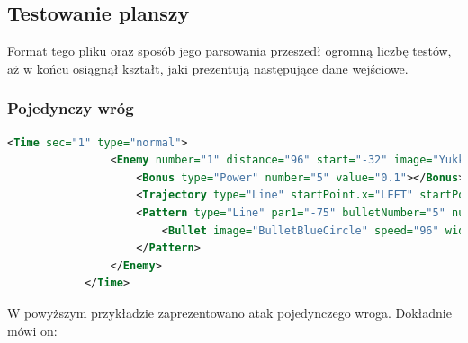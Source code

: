 		\subsection{Testowanie planszy}
		Format tego pliku oraz sposób jego parsowania przeszedł ogromną liczbę testów, aż w końcu osiągnął kształt, jaki prezentują następujące dane wejściowe.
		\subsubsection{Pojedynczy wróg}
		\begin{lstlisting}[language=xml]
			<Time sec="1" type="normal">
				<Enemy number="1" distance="96" start="-32" image="YukkuriReimu" life="100" speed="450" length="700">
					<Bonus type="Power" number="5" value="0.1"></Bonus>
					<Trajectory type="Line" startPoint.x="LEFT" startPoint.y="ONE_THIRDS" a="0"></Trajectory>
					<Pattern type="Line" par1="-75" bulletNumber="5" number="10" interval="0.1">
						<Bullet image="BulletBlueCircle" speed="96" width="32" height="32" hitboxSize="HALF"></Bullet>
					</Pattern>
				</Enemy>
			</Time>
		\end{lstlisting}
		W powyższym przykładzie zaprezentowano atak pojedynczego wroga. Dokładnie mówi on:
